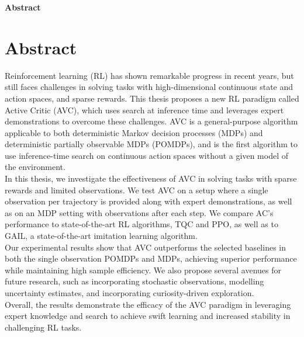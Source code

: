 \clearemptydoublepage
{}
{}

\vspace*{2cm}
\begin{center}
{\Large \textbf{Abstract}}
\end{center}
\vspace{1cm}

\chapter*{Abstract}
\label{chapter:Abstract}

Reinforcement learning (RL) has shown remarkable progress in recent years, but still faces challenges in solving tasks with high-dimensional 
continuous state and action spaces, and sparse rewards. This thesis proposes a new RL paradigm called Active Critic (AVC), which uses search at 
inference time and leverages expert demonstrations to overcome these challenges. AVC is a general-purpose algorithm applicable to both deterministic 
Markov decision processes (MDPs) and deterministic partially observable MDPs (POMDPs), and is the first algorithm to use inference-time search on continuous 
action spaces without a given model of the environment.\\

In this thesis, we investigate the effectiveness of AVC in solving tasks with sparse rewards and limited observations. We test AVC on 
a setup where a single observation per trajectory is provided along with expert demonstrations, as well as on an MDP setting with observations 
after each step. We compare AC's performance to state-of-the-art RL algorithms, TQC and PPO, as well as to GAIL, a state-of-the-art imitation 
learning algorithm. \\

Our experimental results show that AVC outperforms the selected baselines in both the single observation POMDPs and MDPs, achieving superior 
performance while maintaining high sample efficiency. We also propose several avenues for future research, such as incorporating stochastic 
observations, modelling uncertainty estimates, and incorporating curiosity-driven exploration.\\

Overall, the results demonstrate the efficacy of the AVC paradigm in leveraging expert knowledge and search to achieve swift learning and 
increased stability in challenging RL tasks.
